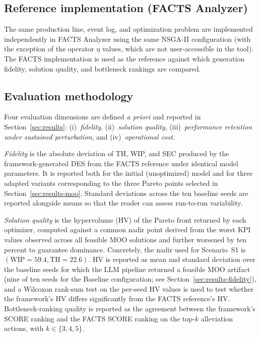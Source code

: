 \documentclass[a4paper,fleqn]{cas-sc}
\begin{document}
  \subsection{Reference implementation (FACTS Analyzer)}\label{sec:case-ref}                                            
                                                                                                                        
  The same production line, event log, and optimization problem are implemented independently in FACTS Analyzer using   
  the same NSGA-II configuration (with the exception of the operator $\eta$ values, which are not user-accessible in the
   tool). The FACTS implementation is used as the reference against which generation fidelity, solution quality, and    
  bottleneck rankings are compared.                         

  \subsection{Evaluation methodology}\label{sec:case-evaluation}                                                        
   
  Four evaluation dimensions are defined \emph{a priori} and reported in Section~\ref{sec:results}: (i)~\emph{fidelity},
   (ii)~\emph{solution quality}, (iii)~\emph{performance retention under sustained perturbation}, and (iv)~\emph{operational cost}.
                                                                                                                        
  \emph{Fidelity} is the absolute deviation of TH, WIP, and SEC produced by the framework-generated DES from the FACTS  
  reference under identical model parameters. It is reported both for the initial (unoptimized) model and for three
  adapted variants corresponding to the three Pareto points selected in Section~\ref{sec:results-moo}. Standard         
  deviations across the ten baseline seeds are reported alongside means so that the reader can assess run-to-run
  variability.

  \emph{Solution quality} is the hypervolume (HV) of the Pareto front returned by each optimizer, computed against a    
  common nadir point derived from the worst KPI values observed across all feasible MOO solutions and further worsened
  by ten percent to guarantee dominance. Concretely, the nadir used for Scenario~S1 is $(\mathrm{WIP} = 59.4,           
  \mathrm{TH} = 22.6)$. HV is reported as mean and standard deviation over the baseline seeds for which the LLM pipeline returned a feasible MOO artifact (nine of ten seeds for the Baseline configuration; see Section~\ref{sec:results-fidelity}), and a Wilcoxon rank-sum test
  on the per-seed HV values is used to test whether the framework's HV differs significantly from the FACTS reference's
  HV. Bottleneck-ranking quality is reported as the agreement between the framework's SCORE ranking and the FACTS SCORE
  ranking on the top-$k$ alleviation actions, with $k \in \{3, 4, 5\}$.
\end{document}
